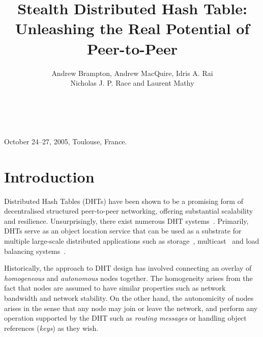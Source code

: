 \documentclass{sig-alt-release}
\begin{document}
 {October 24--27, 2005, Toulouse,
France.}

\title{
  Stealth Distributed Hash Table:\\
  Unleashing the Real Potential of Peer-to-Peer
}


\author {
  \alignauthor Andrew Brampton, Andrew MacQuire, Idris A. Rai\\ Nicholas J. P. Race and Laurent Mathy\\
  \\
  \\
}

\maketitle




\section{Introduction}
\label{sect:intro}

Distributed Hash Tables (DHTs) have been shown to be a promising
form of decentralised structured peer-to-peer networking, offering
substantial scalability and resilience. Unsurprisingly, there exist
numerous DHT systems~\cite{can01}\cite{pastry01}\cite{chord01}.
Primarily, DHTs serve as an object location service that can be used
as a substrate for multiple large-scale distributed applications
such as storage~\cite{past}\cite{oceanstore},
multicast~\cite{scribe}\cite{split} and load balancing
systems~\cite{kar04}\cite{bri05}.

Historically, the approach to DHT design has involved connecting an
overlay of {\em homogeneous} and {\em autonomous} nodes together.
The homogeneity arises from the fact that nodes are assumed to have
similar properties such as network bandwidth and network stability.
On the other hand, the autonomicity of nodes arises in the sense
that any node may join or leave the network, and perform any
operation supported by the DHT such as {\em routing messages} or
handling object references ({\em keys}) as they wish.
\end{document}
